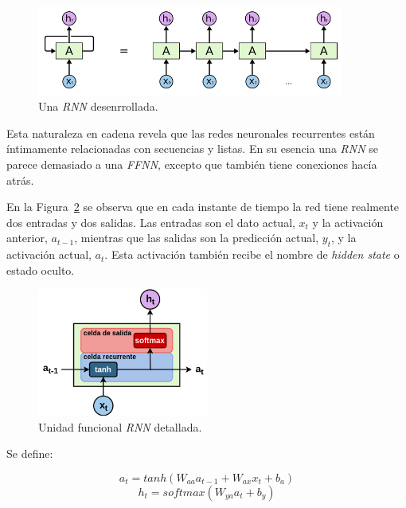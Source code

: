 \documentclass[a4paper,12pt]{article}
\begin{document}
\begin{figure}[H]
	\begin{center}
		\includegraphics[width=0.9\textwidth]{tesis_28.png}
		\caption{Una \textit{RNN} desenrrollada. \citep{olahlstm}}
		\label{fig:rnnunrolled}
	\end{center}
\end{figure}

Esta naturaleza en cadena revela que las redes neuronales recurrentes están íntimamente relacionadas con secuencias y listas. En su esencia una \textit{RNN} se parece demasiado a una \textit{FFNN}, excepto que también tiene conexiones hacía atrás.

\clearpage

En la Figura~\ref{fig:rnnunitv2} se observa que en cada instante de tiempo la red tiene realmente dos entradas y dos salidas. Las entradas son el dato actual, $x_t$ y la activación anterior, $a_{t-1}$, mientras que las salidas son la predicción actual, $y_t$, y la activación actual, $a_t$. Esta activación también recibe el nombre de \textit{hidden state} o estado oculto.

\begin{figure}[H]
	\begin{center}				
		\includegraphics[width=0.5\textwidth]{rnnunitv2.png}
		\caption{Unidad funcional \textit{RNN} detallada. \citep{olahlstm}}
		\label{fig:rnnunitv2}
	\end{center}
\end{figure}

Se define:

$$ a_{t} = tanh(W_{aa}a_{t-1}+W_{ax}x_t+b_a) $$
$$ h_t = softmax(W_{ya}a_t + b_y) $$
\end{document}
